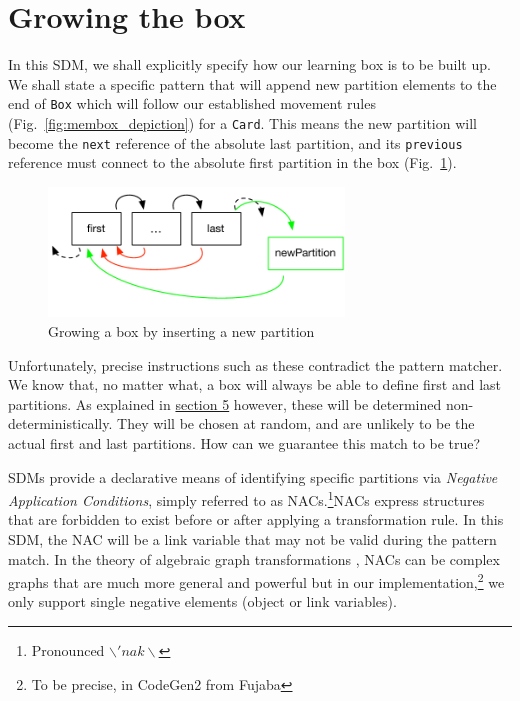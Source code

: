 \newpage
\section{Growing the box}
\genHeader
\hypertarget{sec:growBox}{}

In this SDM, we shall explicitly specify how our learning box is to be built up. We shall state a specific pattern that will append new partition elements
to the end of \texttt{Box} which will follow our established movement rules (Fig.~\ref{fig:membox_depiction}) for a \texttt{Card}. This means the new partition
will become the \texttt{next} reference of the absolute last partition, and its \texttt{previous} reference must connect to the absolute first partition in the
box (Fig.~\ref{fig:goal_grow}).

\begin{figure}[htbp]
 	\centering
  	\includegraphics[width=0.7\textwidth]{growBoxNACGoal.pdf}
	\caption{Growing a box by inserting a new partition}
	\label{fig:goal_grow}
\end{figure}
\FloatBarrier

Unfortunately, precise instructions such as these contradict the pattern matcher. We know that, no matter what, a box will always be able to
define first and last partitions. As explained in \hyperlink{sec:emptyPartition}{section 5} however, these will be determined non-deterministically. They will
be chosen at random, and are unlikely to be the actual first and last partitions. How can we guarantee this match to be true?

SDMs provide a declarative means of identifying specific partitions via \emph{Negative Application Conditions}, simply referred to as
\mbox{NAC}s.\footnote{Pronounced $\backslash 'nak \backslash$}\mbox{NAC}s express structures that are forbidden to exist before or after applying a
transformation rule. In this SDM, the \mbox{NAC} will be a link variable that may not be valid during the pattern match. In the theory of algebraic
graph transformations \cite{EEPT06}, \mbox{NACs} can be complex graphs that are much more general and powerful but in our implementation,\footnote{To be
precise, in CodeGen2 from Fujaba} we only support single negative elements (object or link variables).


